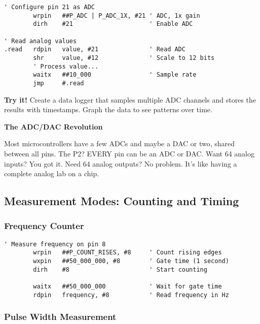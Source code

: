 \documentclass[11pt]{book}
\begin{document}
\begin{lstlisting}
' Configure pin 21 as ADC
        wrpin   ##P_ADC | P_ADC_1X, #21 ' ADC, 1x gain
        dirh    #21                     ' Enable ADC
        
' Read analog values
.read   rdpin   value, #21              ' Read ADC
        shr     value, #12              ' Scale to 12 bits
        ' Process value...
        waitx   ##10_000                ' Sample rate
        jmp     #.read
\end{lstlisting}

\textbf{Try it!} Create a data logger that samples multiple ADC channels
and stores the results with timestamps. Graph the data to see patterns
over time.

\begin{interlude}
\textbf{The ADC/DAC Revolution}

Most microcontrollers have a few ADCs and maybe a DAC or two, shared between all pins. The P2? EVERY pin can be an ADC or DAC. Want 64 analog inputs? You got it. Need 64 analog outputs? No problem. It's like having a complete analog lab on a chip.
\end{interlude}

\hypertarget{measurement-modes-counting-and-timing}{%
\subsection{Measurement Modes: Counting and
Timing}\label{measurement-modes-counting-and-timing}}

\hypertarget{frequency-counter}{%
\subsubsection{Frequency Counter}\label{frequency-counter}}

\begin{lstlisting}
' Measure frequency on pin 8
        wrpin   ##P_COUNT_RISES, #8     ' Count rising edges
        wxpin   ##50_000_000, #8        ' Gate time (1 second)
        dirh    #8                      ' Start counting
        
        waitx   ##50_000_000            ' Wait for gate time
        rdpin   frequency, #8           ' Read frequency in Hz
\end{lstlisting}

\hypertarget{pulse-width-measurement}{%
\subsubsection{Pulse Width Measurement}\label{pulse-width-measurement}}
\end{document}
